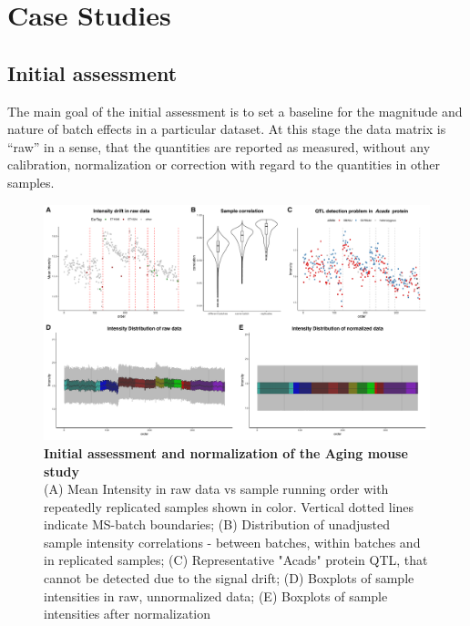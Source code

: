 \documentclass[num-refs]{wiley-article}
\begin{document}
\section{Case Studies}\label{subsec:case_studies}
\subsection{Initial assessment}
The main goal of the initial assessment is to set a baseline for the magnitude and nature of batch effects in a particular dataset. At this stage the data matrix is “raw” in a sense, that the quantities are reported as measured, without any calibration, normalization or correction with regard to the quantities in other samples.


\begin{figure}[hbt]
	\includegraphics[width=\textwidth]{figures/Fig1_initial_assessment_v5_edited.pdf}
	
	\caption{\textbf{Initial assessment and normalization of the Aging mouse study} \\
		\footnotesize
		(A) Mean Intensity in raw data vs sample running order with repeatedly replicated samples shown in color. Vertical dotted lines indicate MS-batch boundaries; (B) Distribution of unadjusted sample intensity correlations - between batches, within batches and in replicated samples; (C) Representative "Acads" protein QTL, that cannot be detected due to the signal drift; (D) Boxplots of sample intensities in raw, unnormalized data; (E) Boxplots of sample intensities after normalization}
	\label{fig:batch_fig2_initAssessment}
\end{figure}
\end{document}
